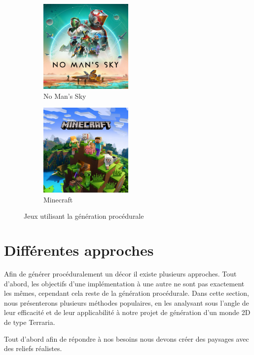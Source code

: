 \documentclass[12pt]{article}
\begin{document}
\begin{figure}[!h]
  \centering
  \begin{subfigure}[b]{0.4\textwidth}
    \centering
    \includegraphics[width=0.5\textwidth]{assets/nomanssky.png}
    \caption{No Man's Sky}
  \end{subfigure}
  \hspace{0.6cm}
  \begin{subfigure}[b]{0.4\textwidth}
    \centering
    \includegraphics[width=0.5\textwidth]{assets/minecraft.png}
    \caption{Minecraft}
  \end{subfigure}
  \hspace{0.6cm}
  \label{games}
  \caption{Jeux utilisant la génération procédurale}
\end{figure}

\section{Différentes approches}

Afin de générer procéduralement un décor il existe plusieurs approches. Tout d'abord, les objectifs d'une implémentation à une autre ne sont pas exactement les mêmes, cependant cela reste de la génération procédurale. Dans cette section, nous présenterons plusieurs méthodes populaires, en les analysant sous l’angle de leur efficacité et de leur applicabilité à notre projet de génération d’un monde 2D de type Terraria.\par
Tout d'abord afin de répondre à nos besoins nous devons créer des paysages avec des reliefs réalistes.
\newpage
\vspace{1cm}
\end{document}
